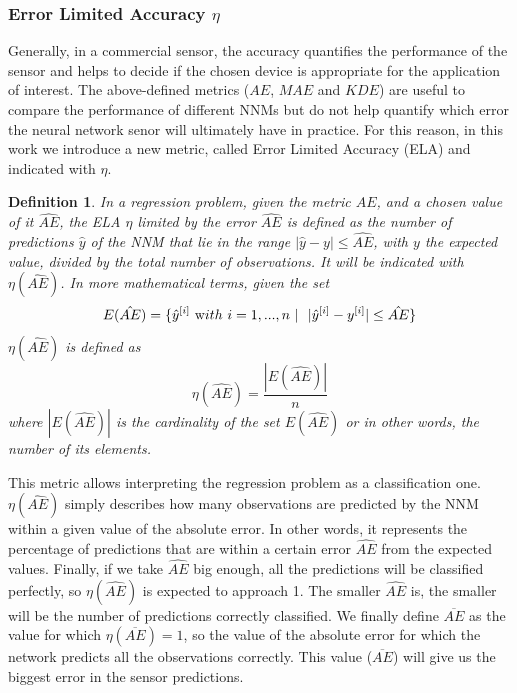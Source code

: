 \documentclass[final,5p,times,twocolumn]{elsarticle}
\newtheorem*{definition*}{Definition}
\begin{document}
\subsubsection{Error Limited Accuracy $\eta$}
\label{sektion:ela}

Generally, in a commercial sensor, the accuracy quantifies the performance of the sensor and helps to decide if the chosen device is appropriate for the application of interest. The above-defined metrics ($AE$, $MAE$ and $KDE$) are useful to compare the performance of different NNMs but do not help quantify which error the neural network senor will ultimately have in practice.
For this reason, in this work we introduce a new metric, called Error Limited Accuracy (ELA) and indicated with $\eta$.

\begin{definition*}
In a regression problem, given the metric $AE$, and a chosen value of it $\hat{AE}$, the ELA  $\eta$ limited by the error $\hat{AE}$ is defined as the number of predictions $\hat y$ of the NNM that lie in the range $|\hat y-y|\leq \hat{AE}$, with $y$ the expected value, divided by the total number of observations. It will be indicated with $\eta(\hat{AE})$. In more mathematical terms, given the set
\begin{equation}
E(\hat{AE}) = \{ \hat y^{[i]} \ {\text with } \ i = 1,..., n\ | \ \ |\hat y^{[i]}-y^{[i]}|\leq \hat{AE} \} 
\end{equation}
$\eta(\hat{AE})$ is defined as
\begin{equation}
\eta(\hat{AE}) = \frac{|E(\hat{AE})|}{n}
\end{equation}
where $|E(\hat{AE})|$ is the cardinality of the set $E(\hat{AE})$ or in other words, the number of its elements.
\end{definition*}

This metric allows interpreting the regression problem as a classification one. $\eta(\hat{AE})$ simply describes how many observations are predicted by the NNM within a given value of the absolute error. In other words, it represents the percentage of predictions that are within a certain error $\hat{AE}$ from the expected values. Finally, if we take $\hat{AE}$ big enough, all the predictions will be classified perfectly, so $\eta(\hat{AE})$ is expected to approach 1. The smaller $\hat{AE}$ is, the smaller will be the number of predictions correctly classified. We finally define $\overline{AE}$ as the value for which $\eta(\overline{AE})=1$, so the value of the absolute error for which the network predicts all the observations correctly. This value ($\overline{AE}$) will give us the biggest error in the sensor predictions.
\end{document}
